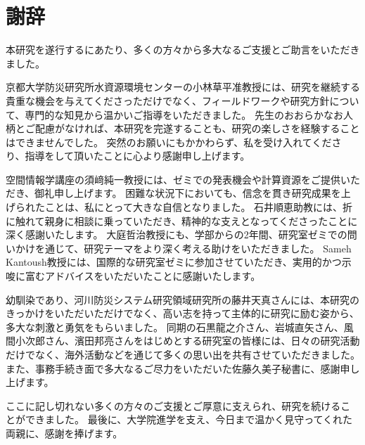\newpage
\section*{謝辞}


本研究を遂行するにあたり、多くの方々から多大なるご支援とご助言をいただきました。

京都大学防災研究所水資源環境センターの小林草平准教授には、研究を継続する貴重な機会を与えてくださっただけでなく、フィールドワークや研究方針について、専門的な知見から温かいご指導をいただきました。
先生のおおらかなお人柄とご配慮がなければ、本研究を完遂することも、研究の楽しさを経験することはできませんでした。
突然のお願いにもかかわらず、私を受け入れてくださり、指導をして頂いたことに心より感謝申し上げます。

空間情報学講座の須﨑純一教授には、ゼミでの発表機会や計算資源をご提供いただき、御礼申し上げます。
困難な状況下においても、信念を貫き研究成果を上げられたことは、私にとって大きな自信となりました。
石井順恵助教には、折に触れて親身に相談に乗っていただき、精神的な支えとなってくださったことに深く感謝いたします。 
大庭哲治教授にも、学部からの2年間、研究室ゼミでの問いかけを通じて、研究テーマをより深く考える助けをいただきました。
Sameh Kantoush教授には、国際的な研究室ゼミに参加させていただき、実用的かつ示唆に富むアドバイスをいただいたことに感謝いたします。 

幼馴染であり、河川防災システム研究領域研究所の藤井天真さんには、本研究のきっかけをいただいただけでなく、高い志を持って主体的に研究に励む姿から、多大な刺激と勇気をもらいました。 
同期の石黒龍之介さん、岩城直矢さん、風間小次郎さん、濱田邦亮さんをはじめとする研究室の皆様には、日々の研究活動だけでなく、海外活動などを通じて多くの思い出を共有させていただきました。
また、事務手続き面で多大なるご尽力をいただいた佐藤久美子秘書に、感謝申し上げます。

ここに記し切れない多くの方々のご支援とご厚意に支えられ、研究を続けることができました。
最後に、大学院進学を支え、今日まで温かく見守ってくれた両親に、感謝を捧げます。
